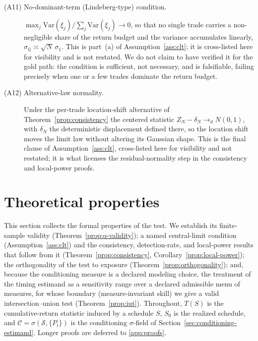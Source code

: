 \documentclass[risks,article,submit,pdftex,oneauthor]{Definitions/mdpi}
\begin{document}
\begin{Assumption}
\begin{description}
\item[(A11) No-dominant-term (Lindeberg-type) condition.]
$\max_j\mathrm{Var}(\xi_j)/\allowbreak\sum_j\mathrm{Var}(\xi_j)\to0$, so that no single
trade carries a non-negligible share of the return budget and the variance
accumulates linearly, $\sigma_{\mathbb Q}\asymp\sqrt N\,\sigma_1$. This is
part~(a) of Assumption~\ref{ass:clt}; it is cross-listed here for visibility and
is not restated. We do not claim to have verified it for the gold path: the
condition is sufficient, not necessary, and is falsifiable, failing precisely
when one or a few trades dominate the return budget.

\item[(A12) Alternative-law normality.] Under the per-trade location-shift
alternative of Theorem~\ref{prop:consistency} the centered statistic
$Z_N-\delta_N\to_d N(0,1)$, with $\delta_N$ the deterministic displacement defined
there, so the location shift moves the limit law without altering its Gaussian
shape. This is the final clause of Assumption~\ref{ass:clt}, cross-listed here for
visibility and not restated; it is what licenses the residual-normality step in the
consistency and local-power proofs.
\end{description}
\end{Assumption}

\section{Theoretical properties}
\label{sec:theory}

This section collects the formal properties of the test. We establish its
finite-sample validity (Theorem~\ref{prop:q-validity}); a named central-limit
condition (Assumption~\ref{ass:clt}) and the consistency, detection-rate, and
local-power results that follow from it (Theorem~\ref{prop:consistency},
Corollary~\ref{prop:local-power}); the orthogonality of the test to exposure
(Theorem~\ref{prop:orthogonality}); and, because the conditioning measure is a
declared modeling choice, the treatment of the timing estimand as a sensitivity
range over a declared admissible menu of measures, for whose boundary
(measure-invariant skill) we give a valid intersection--union test
(Theorem~\ref{prop:iut}). Throughout, $T(S)$ is the cumulative-return statistic
induced by a schedule $S$, $S_0$ is the realized schedule, and
$\mathcal C=\sigma(\mathcal S,\{P_t\})$ is the conditioning $\sigma$-field of
Section~\ref{sec:conditioning-estimand}. Longer proofs are deferred to
\ref{app:proofs}.
\end{document}
